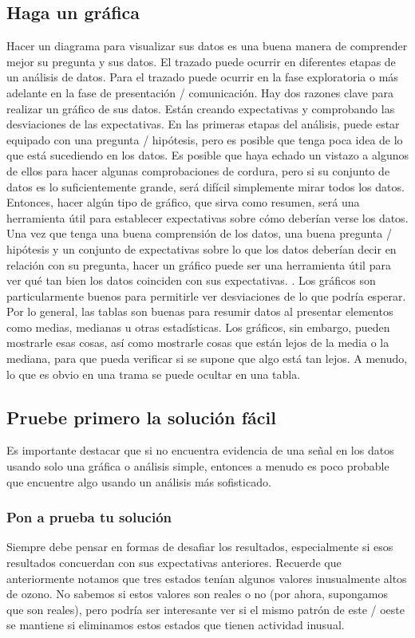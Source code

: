 \documentclass[10pt]{book}
\begin{document}
        \subsection{Haga un gráfica}
        Hacer un diagrama para visualizar sus datos es una buena manera de comprender mejor su pregunta y sus datos. El trazado puede ocurrir en diferentes etapas de un análisis de datos. Para el trazado puede ocurrir en la fase exploratoria o más adelante en la fase de presentación / comunicación. Hay dos razones clave para realizar un gráfico de sus datos. Están creando expectativas y comprobando las desviaciones de las expectativas. En las primeras etapas del análisis, puede estar equipado con una pregunta / hipótesis, pero es posible que tenga poca idea de lo que está sucediendo en los datos. Es posible que haya echado un vistazo a algunos de ellos para hacer algunas comprobaciones de cordura, pero si su conjunto de datos es lo suficientemente grande, será difícil simplemente mirar todos los datos. Entonces, hacer algún tipo de gráfico, que sirva como resumen, será una herramienta útil para establecer expectativas sobre cómo deberían verse los datos. Una vez que tenga una buena comprensión de los datos, una buena pregunta / hipótesis y un conjunto de expectativas sobre lo que los datos deberían decir en relación con su pregunta, hacer un gráfico puede ser una herramienta útil para ver qué tan bien los datos coinciden con sus expectativas. . Los gráficos son particularmente buenos para permitirle ver desviaciones de lo que podría esperar. Por lo general, las tablas son buenas para resumir datos al presentar elementos como medias, medianas u otras estadísticas. Los gráficos, sin embargo, pueden mostrarle esas cosas, así como mostrarle cosas que están lejos de la media o la mediana, para que pueda verificar si se supone que algo está tan lejos. A menudo, lo que es obvio en una trama se puede ocultar en una tabla.\\

        \subsection{Pruebe primero la solución fácil}
        Es importante destacar que si no encuentra evidencia de una señal en los datos usando solo una gráfica o análisis simple, entonces a menudo es poco probable que encuentre algo usando un análisis más sofisticado.\\

            \subsubsection{Pon a prueba tu solución}
            Siempre debe pensar en formas de desafiar los resultados, especialmente si esos resultados concuerdan con sus expectativas anteriores. Recuerde que anteriormente notamos que tres estados tenían algunos valores inusualmente altos de ozono. No sabemos si estos valores son reales o no (por ahora, supongamos que son reales), pero podría ser interesante ver si el mismo patrón de este / oeste se mantiene si eliminamos estos estados que tienen actividad inusual.\\
\end{document}
